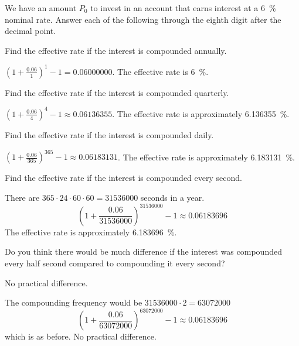 \begin{exercises}
\begin{problem}
We have an amount $P_0$ to invest in an account that earns interest at a \SI{6}{\percent} nominal rate. 
Answer each of the following through the eighth digit after the decimal point.
\begin{subproblem}
	Find the effective rate if the interest is compounded annually.
	\begin{shortsolution}
		$\left( 1+\frac{0.06}{1} \right)^1-1 = 0.06000000$. The effective rate is
		\SI{6}{\percent}.
	\end{shortsolution}
\end{subproblem}
\begin{subproblem}
	Find the effective rate if the interest is compounded quarterly.
	\begin{shortsolution}
		$\left( 1+\frac{0.06}{4} \right)^4-1 \approx 0.06136355$. The effective rate 
		is approximately \SI{6.136355}{\percent}.
	\end{shortsolution}
\end{subproblem}
\begin{subproblem}
	Find the effective rate if the interest is compounded daily.
	\begin{shortsolution}
		$\left( 1+\frac{0.06}{365} \right)^{365}-1 \approx 0.06183131$. The effective rate
		is approximately \SI{6.183131}{\percent}.
	\end{shortsolution}
\end{subproblem}
\begin{subproblem}
	Find the effective rate if the interest is compounded every second.
	\begin{shortsolution}
		There are $365\cdot 24\cdot 60\cdot 60 = 31536000$ seconds in a year.
		\[
			\left( 1+\frac{0.06}{31536000} \right)^{31536000}-1 \approx 0.06183696
		\]
		The effective rate is approximately \SI{6.183696}{\percent}.
	\end{shortsolution}
\end{subproblem}
\begin{subproblem}\label{exp:prob:compoundedhalfsecond}
	Do you think there would be much difference if the interest was compounded 
	every half second compared to compounding it every second?
	\begin{shortsolution}
		No practical difference.
	\end{shortsolution}
	\begin{longsolution}
		The compounding frequency would be $31536000\cdot 2 = 63072000$
		\[
			\left( 1+\frac{0.06}{63072000} \right)^{63072000}-1 \approx 0.06183696
		\]
		which is as before. No practical difference.
	\end{longsolution}
\end{subproblem}
\end{problem}
			

\end{exercises}
